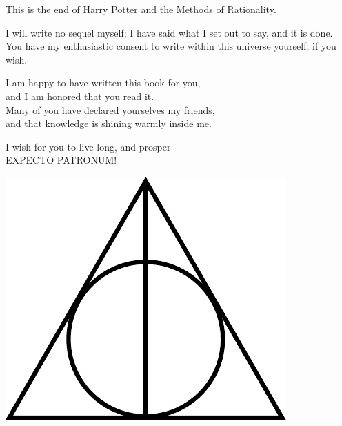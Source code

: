 \newpage
\begin{chapterOpeningAuthorNote}
This is the end of Harry Potter and the Methods of Rationality.

I will write no sequel myself; I have said what I set out to say, and it is done.\\
You have my enthusiastic consent to write within this universe yourself, if you wish.




I am happy to have written this book for you,\\
and I am honored that you read it.\\
Many of you have declared yourselves my friends,\\
and that knowledge is shining warmly inside me.

I wish for you to live long, and prosper\\
EXPECTO PATRONUM!
\end{chapterOpeningAuthorNote}

\vspace*{\fill}
{
\begin{center}
\includegraphics[scale=0.125]{images/Deathly_Hallows_Sign.pdf}
\end{center}
}
\vspace*{\fill}
\clearpage

